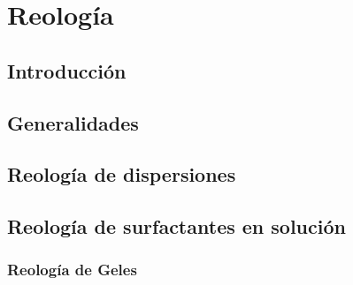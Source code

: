 \chapter{Reología}
\label{chp:reologia}

\section{Introducción}

\section{Generalidades}
\section{Reología de dispersiones}
\section{Reología de surfactantes en solución}
\subsection{Reología de Geles}